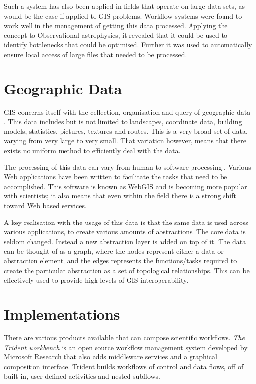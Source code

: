 \documentclass[11pt,twocolumn]{article}
\begin{document}
    Such a system has also been applied in fields that
    operate on large data sets, as would be the case if
    applied to GIS problems\cite{Aragon:2009:WMH:1529282.1529491}.
    Workflow systems were found
    to work well in the management of getting this data
    processed. Applying the concept to Observational
    astrophysics, it revealed that it could be used
    to identify bottlenecks that could be optimised.
    Further it was used to automatically ensure local
    access of large files that needed to be processed.


\section{Geographic Data}
    GIS concerns itself with the collection, organisation
    and query of geographic data \cite{DiMartino:2007:TAG:1341012.1341081}.
    This data includes but  is not limited to landscapes,
    coordinate data, building models,
    statistics, pictures, textures and routes. This
    is a very broad set of data, varying from very large to very small.
    That variation however, means that there exists no uniform method
    to efficiently deal with the data.

    The processing of this data can vary from human to software
    processing \cite{DiMartino:2007:TAG:1341012.1341081}.
    Various Web applications have been written
    to facilitate the tasks that need to be accomplished.
    This software is known as WebGIS and is becoming more
    popular with scientists; it also means that even within
    the field there is a strong shift toward Web based services.


    A key realisation with the usage of this data is that
    the same data is used across various applications,
    to create various amounts of  abstractions\cite{ElAdnani:2001:MLF:512161.512177}.
    The core data is seldom changed. Instead a new abstraction
    layer is added on top of it. The data
    can be thought of as a graph, where the nodes represent
    either a data or abstraction element, and the edges
    represents the functions/tasks required to create the
    particular abstraction as a set of topological
    relationships. This can be effectively used to provide
    high levels of GIS
    interoperability.

\section{Implementations}
    There are various products available that can compose
    scientific workflows. \emph{The Trident workbench}
    \cite{Simmhan:2009:BTS:1673063.1673121} is an open
    source workflow management system developed by Microsoft
    Research that also adds middleware services and a graphical
    composition interface. Trident builds workflows of control
    and data flows, off of built-in, user defined activities and
    nested subflows.
\end{document}
